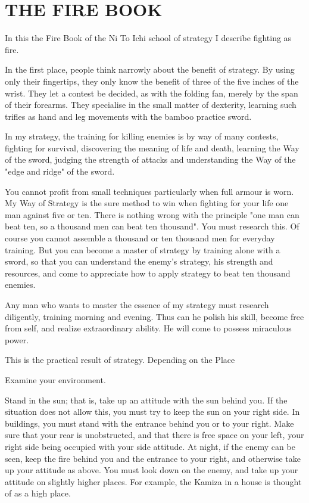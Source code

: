 \chapter{THE FIRE BOOK}

In this the Fire Book of the Ni To Ichi school of strategy I describe fighting as fire.

In the first place, people think narrowly about the benefit of strategy. By using only their fingertips, they only know the benefit of three of the five inches of the wrist. They let a contest be decided, as with the folding fan, merely by the span of their forearms. They specialise in the small matter of dexterity, learning such trifles as hand and leg movements with the bamboo practice sword.

In my strategy, the training for killing enemies is by way of many contests, fighting for survival, discovering the meaning of life and death, learning the Way of the sword, judging the strength of attacks and understanding the Way of the "edge and ridge" of the sword.

You cannot profit from small techniques particularly when full armour is worn. My Way of Strategy is the sure method to win when fighting for your life one man against five or ten. There is nothing wrong with the principle "one man can beat ten, so a thousand men can beat ten thousand". You must research this. Of course you cannot assemble a thousand or ten thousand men for everyday training. But you can become a master of strategy by training alone with a sword, so that you can understand the enemy's strategy, his strength and resources, and come to appreciate how to apply strategy to beat ten thousand enemies.

Any man who wants to master the essence of my strategy must research diligently, training morning and evening. Thus can he polish his skill, become free from self, and realize extraordinary ability. He will come to possess miraculous power.

This is the practical result of strategy.
Depending on the Place

Examine your environment.

Stand in the sun; that is, take up an attitude with the sun behind you. If the situation does not allow this, you must try to keep the sun on your right side. In buildings, you must stand with the entrance behind you or to your right. Make sure that your rear is unobstructed, and that there is free space on your left, your right side being occupied with your side attitude. At night, if the enemy can be seen, keep the fire behind you and the entrance to your right, and otherwise take up your attitude as above. You must look down on the enemy, and take up your attitude on slightly higher places. For example, the Kamiza in a house is thought of as a high place.

